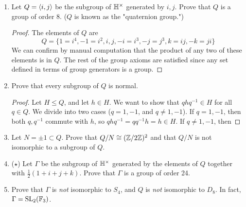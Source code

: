 \documentclass[../psets.tex]{subfiles}
\begin{document}
\begin{enumerate}
\begin{enumerate}
\begin{proof}
            \begin{equation*}
                1\cdot(a+bi+cj+dk) = (a+bi+cj+dk)\cdot 1
                = a+bi+cj+dk
            \end{equation*}
            where $a+bi+cj+dk\in\HH^\times$ is arbitrary. For every $q\in\HH^\times$, pick $\bar{q}/N(q)$ to be its inverse; by part (a), we have that
            \begin{equation*}
                q\cdot\frac{\bar{q}}{N(q)} = \frac{N(q)}{N(q)}
                = 1
                = \frac{N(q)}{N(q)}
                = \frac{\bar{q}}{N(q)}\cdot q
            \end{equation*}
            Associativity holds by hypothesis. Therefore, $\HH^\times$ is a group, as desired.
        \end{proof}
        \item Let $Q=\left\langle{i,j}\right\rangle$ be the subgroup of $\HH^\times$ generated by $i,j$. Prove that $Q$ is a group of order 8. ($Q$ is known as the "quaternion group.")
        \begin{proof}
            The elements of $Q$ are
            \begin{equation*}
                Q = \{1=i^4,-1=i^2,i,j,-i=i^3,-j=j^3,k=ij,-k=ji\}
            \end{equation*}
            We can confirm by manual computation that the product of any two of these elements is in $Q$. The rest of the group axioms are satisfied since any set defined in terms of group generators is a group.
        \end{proof}
        \item Prove that every subgroup of $Q$ is normal.
        \begin{proof}
            Let $H\leq Q$, and let $h\in H$. We want to show that $qhq^{-1}\in H$ for all $q\in Q$. We divide into two cases ($q=1,-1$, and $q\neq 1,-1$). If $q=1,-1$, then both $q,q^{-1}$ commute with $h$, so $qhq^{-1}=qq^{-1}h=h\in H$. If $q\neq 1,-1$, then 
        \end{proof}
        \item Let $N=\pm 1\subset Q$. Prove that $Q/N\cong(\mathbb{Z}/2\mathbb{Z})^2$ and that $Q/N$ is not isomorphic to a subgroup of $Q$.
        \item ($\star$) Let $\Gamma$ be the subgroup of $\HH^\times$ generated by the elements of $Q$ together with $\frac{1}{2}(1+i+j+k)$. Prove that $\Gamma$ is a group of order 24.
        \item Prove that $\Gamma$ is \emph{not} isomorphic to $S_4$, and $Q$ is \emph{not} isomorphic to $D_8$. In fact, $\Gamma=\text{SL}_2(\mathbb{F}_3)$.

\end{enumerate}
\end{enumerate}
\end{document}
